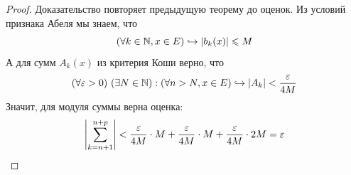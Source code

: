 \begin{proof}
	Доказательство повторяет предыдущую теорему до оценок. Из условий признака Абеля мы знаем, что
	\[
		(\forall k \in \mathbb{N}, x \in E)\hookrightarrow |b_k(x)| \leqslant M
	\]
	А для сумм $A_k(x)$ из критерия Коши верно, что
	\[
		(\forall \varepsilon > 0)\ (\exists N \in \mathbb{N}) : (\forall n > N, x \in E) \hookrightarrow |A_k| < \frac{\varepsilon}{4M}
	\]
	Значит, для модуля суммы верна оценка:
	\[
		\left|\sum\limits_{k = n + 1}^{n + p}\right| < \frac{\varepsilon}{4M} \cdot M + \frac{\varepsilon}{4M} \cdot M + \frac{\varepsilon}{4M} \cdot 2M = \varepsilon
	\]
\end{proof}